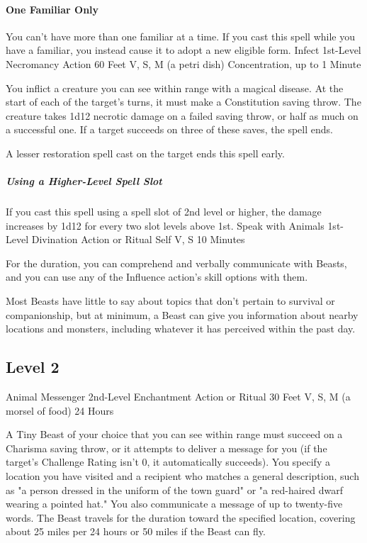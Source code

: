 \documentclass[letterpaper,openany,oneside,twocolumn]{book}
\begin{document}
\paragraph{One Familiar Only} You can't have more than one familiar at a time. If you cast this spell while you have a familiar, you instead cause it to adopt a new eligible form.
\DndSpellHeader
  {Infect}
  {1st-Level Necromancy}
  {Action}
  {60 Feet}
  {V, S, M (a petri dish)}
  {Concentration, up to 1 Minute}

You inflict a creature you can see within range with a magical disease. At the start of each of the target's turns, it must make a Constitution saving throw. The creature takes 1d12 necrotic damage on a failed saving throw, or half as much on a successful one. If a target succeeds on three of these saves, the spell ends.

A lesser restoration spell cast on the target ends this spell early.

\subparagraph*{Using a Higher-Level Spell Slot} If you cast this spell using a spell slot of 2nd level or higher, the damage increases by 1d12 for every two slot levels above 1st.
\DndSpellHeader
  {Speak with Animals}
  {1st-Level Divination}
  {Action or Ritual}
  {Self}
  {V, S}
  {10 Minutes}

For the duration, you can comprehend and verbally communicate with Beasts, and you can use any of the Influence action's skill options with them.

Most Beasts have little to say about topics that don't pertain to survival or companionship, but at minimum, a Beast can give you information about nearby locations and monsters, including whatever it has perceived within the past day.

\subsection*{Level 2}
\DndSpellHeader
  {Animal Messenger}
  {2nd-Level Enchantment}
  {Action or Ritual}
  {30 Feet}
  {V, S, M (a morsel of food)}
  {24 Hours}

A Tiny Beast of your choice that you can see within range must succeed on a Charisma saving throw, or it attempts to deliver a message for you (if the target's Challenge Rating isn't 0, it automatically succeeds). You specify a location you have visited and a recipient who matches a general description, such as "a person dressed in the uniform of the town guard" or "a red-haired dwarf wearing a pointed hat." You also communicate a message of up to twenty-five words. The Beast travels for the duration toward the specified location, covering about 25 miles per 24 hours or 50 miles if the Beast can fly.
\end{document}
